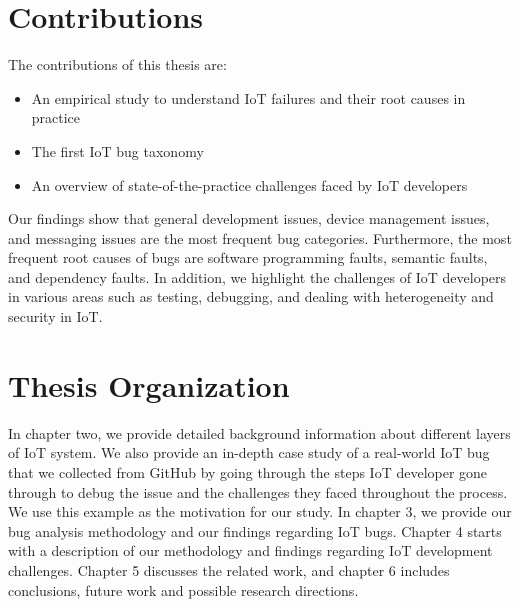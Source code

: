 \section{Contributions  }
The contributions of this thesis are:

\begin{itemize}
\item An empirical study to understand IoT failures and their root causes in practice 
\item The first IoT bug taxonomy
\item An overview of state-of-the-practice challenges faced by IoT developers
\end{itemize}

Our findings show that general development issues, device management issues, and messaging issues are the most frequent bug categories. Furthermore, the most frequent root causes of bugs are software programming faults, semantic faults, and dependency faults. In addition, we highlight the challenges of IoT developers in various areas such as testing, debugging, and dealing with heterogeneity and security in IoT. 

\section{Thesis Organization }
In chapter two, we provide detailed background information about different layers of IoT system. We also provide an in-depth case study of a real-world IoT bug that we collected from GitHub by going through the steps IoT developer gone through to debug the issue and the challenges they faced throughout the process. We use this example as the motivation for our study. In chapter 3, we provide our bug analysis methodology and our findings regarding IoT bugs. Chapter 4 starts with a description of our methodology and findings regarding IoT development challenges. Chapter 5 discusses the related work, and chapter 6 includes conclusions, future work and possible research directions.

\endinput

